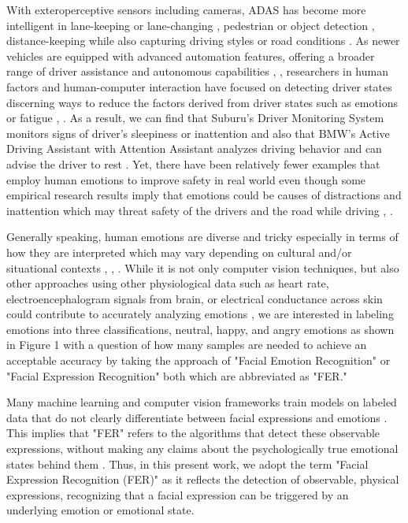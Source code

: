 \documentclass[sigconf]{acmart}
\begin{document}
With exteroperceptive sensors including cameras,  ADAS has become more intelligent in lane-keeping or lane-changing , pedestrian or object detection \cite{bengler2014three}, distance-keeping while also capturing driving styles or road conditions \cite{zepf2020driver}. As newer vehicles are equipped with advanced automation features, offering a broader range of driver assistance and autonomous capabilities \cite{navonchallenging}, \cite{sae2021j3016},   researchers in human factors and human-computer interaction have focused on detecting driver states discerning ways to reduce the factors derived from driver states such as emotions or fatigue \cite{10486424}, \cite{murali2022intelligent}. As a result, we can find that Suburu's Driver Monitoring System monitors signs of driver's sleepiness or inattention and also that BMW's Active Driving Assistant with Attention Assistant analyzes driving behavior and can advise the driver to rest \cite{10486424}. Yet, there have been relatively fewer examples that employ human emotions to improve safety in real world even though some empirical research results imply that emotions could be causes of distractions and inattention which may threat safety of the drivers and the road while driving \cite{chan2015emotion}, \cite{cunningham2016impact}. 

Generally speaking, human emotions are diverse and tricky especially in terms of how they are interpreted which may vary depending on cultural and/or situational contexts \cite{izard2013human}, \cite{picard2003affective}, \cite{kang2019extracting}. While it is not only computer vision techniques, but also other approaches using other physiological data such as heart rate, electroencephalogram signals from brain, or electrical conductance across skin could contribute to accurately analyzing emotions \cite{pidgeon2022end}, \cite{shu2018review} we are interested in labeling emotions into three classifications, neutral, happy, and angry emotions as shown in Figure 1 with a question of how many samples are needed to achieve an acceptable accuracy by taking the approach of "Facial Emotion Recognition" or "Facial Expression Recognition" \cite{ekman1992facial} both which are abbreviated as "FER." 

Many machine learning and computer vision frameworks train models on labeled data that do not clearly differentiate between facial expressions and emotions \cite{kopalidis2024advances}. This implies that "FER" refers to the algorithms that detect these observable expressions, without making any claims about the psychologically true emotional states behind them . Thus, in this present work, we adopt the term "Facial Expression Recognition (FER)" as it reflects the detection of observable, physical expressions, recognizing that a facial expression can be triggered by an underlying emotion or emotional state.
\end{document}
